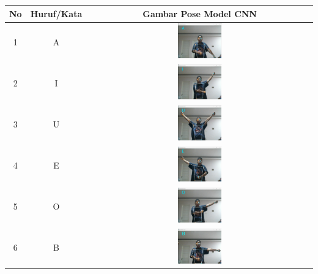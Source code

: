 \begin{table}[h]
	\centering
	\label{tbl:Tabel Contoh Huruf/Kata dan Gambar Pose Model CNN Orang Kedua}
	\begin{tabular}{|c|c|c|}
	\hline
	No & Huruf/Kata & Gambar Pose Model CNN \\
	\hline
	1 & A & \includegraphics[width=0.2\textwidth]{gambar/bener/HurufA_ModelCNN_Fachry.png} \\
	\hline
	2 & I & \includegraphics[width=0.2\textwidth]{gambar/bener/HurufI_ModelCNN_Fachry.png} \\
	\hline
	3 & U & \includegraphics[width=0.2\textwidth]{gambar/bener/HurufU_ModelCNN_Fachry.png} \\
	\hline
	4 & E & \includegraphics[width=0.2\textwidth]{gambar/bener/HurufE_ModelCNN_Fachry.png} \\
	\hline
	5 & O & \includegraphics[width=0.2\textwidth]{gambar/bener/HurufO_ModelCNN_Fachry.png} \\
	\hline
	6 & B & \includegraphics[width=0.2\textwidth]{gambar/bener/HurufB_ModelCNN_Fachry.png} \\

\end{tabular}
\end{table}
